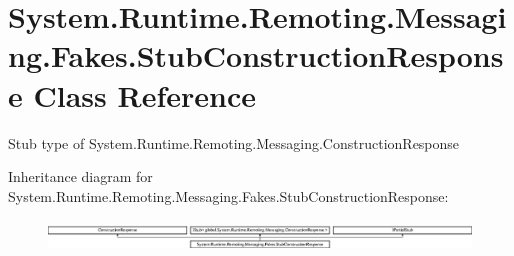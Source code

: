 \hypertarget{class_system_1_1_runtime_1_1_remoting_1_1_messaging_1_1_fakes_1_1_stub_construction_response}{\section{System.\-Runtime.\-Remoting.\-Messaging.\-Fakes.\-Stub\-Construction\-Response Class Reference}
\label{class_system_1_1_runtime_1_1_remoting_1_1_messaging_1_1_fakes_1_1_stub_construction_response}
}


Stub type of System.\-Runtime.\-Remoting.\-Messaging.\-Construction\-Response 


Inheritance diagram for System.\-Runtime.\-Remoting.\-Messaging.\-Fakes.\-Stub\-Construction\-Response\-:\begin{figure}[H]
\begin{center}
\leavevmode
\includegraphics[height=0.833333cm]{class_system_1_1_runtime_1_1_remoting_1_1_messaging_1_1_fakes_1_1_stub_construction_response}
\end{center}
\end{figure}
